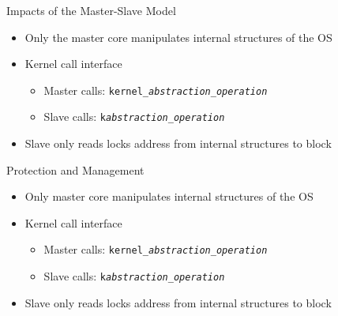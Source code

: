 		\begin{frame}[fragile]{Impacts of the Master-Slave Model}
			\begin{itemize}
				\item Only the master core manipulates internal structures of the OS
				\item Kernel call interface
				\begin{itemize}
					\item Master calls: \texttt{kernel\_\textit{abstraction}\_\textit{operation}}
					\item Slave calls: \texttt{k\textit{abstraction}\_\textit{operation}}
				\end{itemize}
				\item Slave only reads locks address from internal structures to block
			\end{itemize}

		\end{frame}

		\begin{frame}[fragile]{Protection and Management}
			\begin{itemize}
				\item Only master core manipulates internal structures of the OS
				\item Kernel call interface
				\begin{itemize}
					\item Master calls: \texttt{kernel\_\textit{abstraction}\_\textit{operation}}
					\item Slave calls: \texttt{k\textit{abstraction}\_\textit{operation}}
				\end{itemize}
				\item Slave only reads locks address from internal structures to block
			\end{itemize}
		\end{frame}

